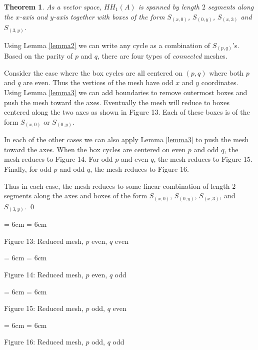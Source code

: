 \documentclass{slides}
\newtheorem{theorem}{Theorem}
\begin{document}
\begin{slide}
\begin{theorem}
As a vector space, $HH_1(A)$ is spanned by length $2$ segments
along the $x$-axis and $y$-axis together with boxes of the form
$S_{(x,0)}$, $S_{(0,y)}$, $S_{(x,3)}$ and $S_{(3,y)}$.
\label{spans}
\end{theorem}

\proof
Using Lemma \ref{lemma2} we can write any cycle
as a combination of $S_{(p,q)}$'s.
Based on the parity of $p$ and $q$, there are four types of
\textit{connected} meshes.

Consider the case where the box cycles are all centered on
$(p,q)$ where both $p$ and $q$ are even.  Thus the vertices of
the mesh have odd $x$ and $y$ coordinates.
Using Lemma \ref{lemma3}
we can add boundaries to remove outermost boxes and push
the mesh toward the axes.  Eventually the mesh will
reduce to boxes centered along the two axes as shown in
Figure 13.  Each of these boxes is of the
form $S_{(x,0)}$ or $S_{(0,y)}$.
\end{slide}

\begin{slide}
In each of the other cases we can also apply Lemma \ref{lemma3} to push the
mesh toward the axes.  When the box cycles are centered
on even $p$ and odd $q$, the mesh reduces to Figure
14.  For odd $p$ and even $q$, the mesh
reduces to Figure 15.  Finally, for
odd $p$ and odd $q$, the mesh reduces to Figure 16.

Thus in each case, the mesh reduces to some linear combination of
length $2$ segments along the axes and boxes of the form $S_{(x,0)}$,
$S_{(0,y)}$, $S_{(x,3)}$, and $S_{(3,y)}$.
\qed
\end{slide}

\begin{slide}
  \begin{center}
    \epsfxsize = 6cm
    \epsfysize = 6cm

Figure 13:  Reduced mesh, $p$ even, $q$ even
  \end{center}

  \begin{center}
    \epsfxsize = 6cm
    \epsfysize = 6cm

Figure 14:  Reduced mesh, $p$ even, $q$ odd
  \end{center}
\end{slide}

\begin{slide}
  \begin{center}
    \epsfxsize = 6cm
    \epsfysize = 6cm

Figure 15:  Reduced mesh, $p$ odd, $q$ even
  \end{center}

  \begin{center}
    \epsfxsize = 6cm
    \epsfysize = 6cm

Figure 16:  Reduced mesh, $p$ odd, $q$ odd
  \end{center}

\end{slide}
\end{document}
